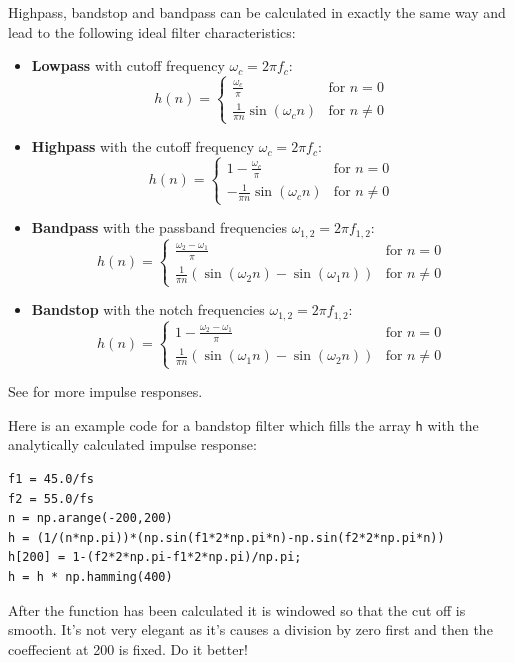 \documentclass[12pt,a4paper]{article}
\begin{document}
Highpass, bandstop and bandpass can be calculated in exactly the same
way and lead to the following ideal filter characteristics:
\begin{itemize}
\item \textbf{Lowpass} with cutoff frequency $\omega_c=2\pi f_c$:
\begin{equation}
h(n) = 
\left\{
\begin{array}{ll}
\frac{\omega_c}{\pi} & \mbox{for $n=0$} \\
\frac{1}{\pi n} \sin(\omega_c n) & \mbox{for $n\neq 0$}
\end{array}
\right.
\label{idealLP}
\end{equation}

\item \textbf{Highpass} with the cutoff frequency $\omega_c=2\pi f_c$:
\begin{equation}
h(n)=
\left\{ 
\begin{array}{ll}
1-\frac{\omega_c}{\pi} & \mbox{for $n=0$} \\
-\frac{1}{\pi n} \sin(\omega_c n) & \mbox{for $n\neq 0$}
\end{array}
\right.
\end{equation}

\item \textbf{Bandpass} with the passband frequencies $\omega_{1,2}=2\pi f_{1,2}$:
\begin{equation}
h(n)=
\left\{ 
\begin{array}{ll}
\frac{\omega_2-\omega_1}{\pi} & \mbox{for $n=0$} \\
\frac{1}{\pi n}(\sin(\omega_2 n)-\sin(\omega_1 n)) & \mbox{for $n\neq 0$}
\end{array}
\right.
\end{equation}

\item \textbf{Bandstop} with the notch frequencies $\omega_{1,2}=2\pi f_{1,2}$:
\begin{equation}
h(n)=
\left\{ 
\begin{array}{ll}
1-\frac{\omega_2-\omega_1}{\pi} & \mbox{for $n=0$} \\
\frac{1}{\pi n}(\sin(\omega_1 n)-\sin(\omega_2 n)) & \mbox{for $n\neq 0$}
\end{array}
\right.
\end{equation}
\end{itemize}
See \citet[p.195]{Diniz2002} for more impulse responses.

Here is an example code for a bandstop filter which fills the array
\texttt{h} with the analytically calculated impulse response:
\begin{verbatim}
f1 = 45.0/fs
f2 = 55.0/fs
n = np.arange(-200,200)
h = (1/(n*np.pi))*(np.sin(f1*2*np.pi*n)-np.sin(f2*2*np.pi*n))
h[200] = 1-(f2*2*np.pi-f1*2*np.pi)/np.pi;
h = h * np.hamming(400)
\end{verbatim}
After the function has been calculated it is windowed so that the
cut off is smooth. It's not very elegant as it's causes a division by zero first and
then the coeffecient at 200 is fixed. Do it better!
\end{document}
